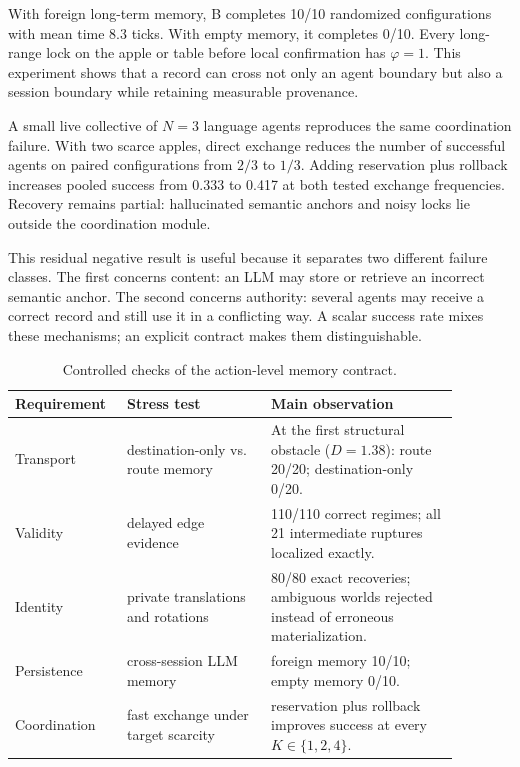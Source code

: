 \documentclass{article}
\begin{document}
With foreign long-term memory, B completes 10/10 randomized configurations with mean time 8.3 ticks. With empty memory, it completes 0/10. Every long-range lock on the apple or table before local confirmation has $\varphi=1$. This experiment shows that a record can cross not only an agent boundary but also a session boundary while retaining measurable provenance.

A small live collective of $N=3$ language agents reproduces the same coordination failure. With two scarce apples, direct exchange reduces the number of successful agents on paired configurations from $2/3$ to $1/3$. Adding reservation plus rollback increases pooled success from 0.333 to 0.417 at both tested exchange frequencies. Recovery remains partial: hallucinated semantic anchors and noisy locks lie outside the coordination module.

This residual negative result is useful because it separates two different failure classes. The first concerns content: an LLM may store or retrieve an incorrect semantic anchor. The second concerns authority: several agents may receive a correct record and still use it in a conflicting way. A scalar success rate mixes these mechanisms; an explicit contract makes them distinguishable.

\begin{table}[t]
\caption{Controlled checks of the action-level memory contract.}
\label{tab:contracttests}
\centering
\small
\begin{tabular}{L{0.19\linewidth}L{0.30\linewidth}L{0.39\linewidth}}
\toprule
Requirement & Stress test & Main observation \\
\midrule
Transport & destination-only vs. route memory & At the first structural obstacle ($D=1.38$): route 20/20; destination-only 0/20. \\
Validity & delayed edge evidence & 110/110 correct regimes; all 21 intermediate ruptures localized exactly. \\
Identity & private translations and rotations & 80/80 exact recoveries; ambiguous worlds rejected instead of erroneous materialization. \\
Persistence & cross-session LLM memory & foreign memory 10/10; empty memory 0/10. \\
Coordination & fast exchange under target scarcity & reservation plus rollback improves success at every $K\in\{1,2,4\}$. \\
\bottomrule
\end{tabular}
\end{table}
\end{document}
